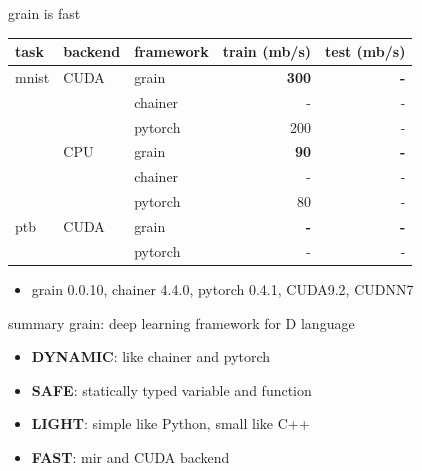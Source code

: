 \documentclass[aspectratio=169,
  14pt,xcolor=dvipsnames,table,professional font,dvipdfmx]{beamer}
\begin{document}
\begin{frame}{grain is \alert{fast}}
    \begin{table}
	\begin{tabular}{lllrr}
      \toprule
      task & backend  & framework & train (mb/s) & test (mb/s) \\
      \midrule
      mnist & CUDA & grain      &  \textbf{300} & \textbf{-} \\
            &      & chainer    & - & - \\
            &      & pytorch    & 200 & - \\
            & CPU  & grain      &  \textbf{90} & \textbf{-} \\
            &      & chainer    & - & - \\
            &      & pytorch    & 80 & - \\
      \midrule
      ptb   & CUDA & grain      &  \textbf{-} & \textbf{-} \\
            &      & pytorch    & - & - \\
      \bottomrule
	\end{tabular}
    \end{table}
    \begin{itemize}
      \item grain 0.0.10, chainer 4.4.0,  pytorch 0.4.1, CUDA9.2, CUDNN7
    \end{itemize}
\end{frame}

\begin{frame}{summary} %
  \large
  grain: deep learning framework for D language
  \vspace{1em}
  \begin{itemize}
    \large
  \item \textbf{DYNAMIC}: like chainer and pytorch
  \item \textbf{SAFE}: statically typed variable and function
  \item \textbf{LIGHT}: simple like Python, small like C++
  \item \textbf{FAST}: mir and CUDA backend
  \end{itemize}
\end{frame}
\end{document}
